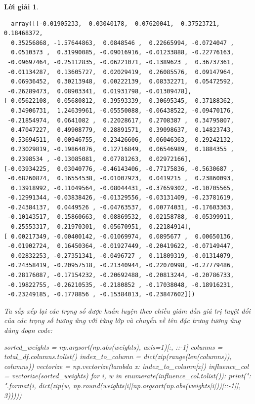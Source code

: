 \documentclass[14pt, a4paper]{article}
\theoremstyle{sltheorem}
\theoremstyle{soltheorem}
\newtheorem*{loigiai}{Lời giải}
\begin{document}
\begin{loigiai}
    \begin{verbatim}
  array([[-0.01905233,  0.03040178,  0.07620041,  0.37523721,  0.18468372,
  0.35256868, -1.57644863,  0.0848546 ,  0.22665994, -0.0724047 ,
  0.0510373 ,  0.31990085, -0.09016916, -0.01233888, -0.22776163,
 -0.09697464, -0.25112835, -0.06221071, -0.1389623 ,  0.36737361,
 -0.01134287,  0.13605727,  0.02029419,  0.26085576,  0.09147964,
  0.06936452,  0.30213948,  0.00222139,  0.08332271,  0.05472592,
 -0.26289473,  0.08903341,  0.01931798, -0.01309478],
[ 0.05622108, -0.05680812,  0.39593339,  0.30695345,  0.37188362,
  0.34906731,  1.24639961, -0.05550088, -0.06438522, -0.09470176,
 -0.21854974,  0.0641082 ,  0.22028617,  0.2708387 ,  0.34795807,
  0.47047227,  0.49908779,  0.28891571,  0.39098637,  0.14823743,
  0.53694511, -0.00946755,  0.23426606, -0.06046363,  0.29242132,
  0.23029819, -0.19864076,  0.12716849,  0.06546989,  0.1884355 ,
  0.2398534 , -0.13085081,  0.07781263,  0.02972166],
[-0.03934225,  0.03040776, -0.46143406, -0.77175836, -0.5630687 ,
 -0.68260874,  0.16554538, -0.01007923,  0.0419215 ,  0.23860093,
  0.13918992, -0.11049564, -0.08044431, -0.37659302, -0.10705565,
 -0.12991344, -0.03838426, -0.01329556, -0.03131409, -0.23781619,
 -0.24384137,  0.0449526 , -0.04763537,  0.00774031, -0.17603363,
 -0.10143517,  0.15860663,  0.08869532,  0.02158788, -0.05399911,
  0.25553317,  0.21970301,  0.05670951,  0.22184914],
[ 0.00217349, -0.00400142, -0.01069974,  0.0895677 ,  0.00650136,
 -0.01902724,  0.16450364, -0.01927449, -0.20419622, -0.07149447,
  0.02832253, -0.27351341, -0.0496727 ,  0.11809319, -0.01314079,
 -0.24358419, -0.20957518, -0.21340944, -0.22070998, -0.27779486,
 -0.28176087, -0.17154232, -0.20692488, -0.20813244, -0.20786733,
 -0.19822755, -0.26210535, -0.2180852 , -0.17038048, -0.18916231,
 -0.23249185, -0.1778856 , -0.15384013, -0.23847602]])
    \end{verbatim}

Ta sắp xếp lại các trọng số được huấn luyện theo chiều giảm dần giá trị tuyệt đối của các trọng số tương ứng với từng lớp và chuyển về tên đặc trưng tương ứng dùng đoạn code:

    \begin{python}
sorted_weights = np.argsort(np.abs(weights), axis=1)[:, ::-1]
columns = total_df.columns.tolist()
index_to_column = dict(zip(range(len(columns)), columns))
vectorize = np.vectorize(lambda x: index_to_column[x])
influence_col = vectorize(sorted_weights)
for i, w in enumerate(influence_col.tolist()):
    print("{}: {}".format(i, dict(zip(w, np.round(weights[i][np.argsort(np.abs(weights[i]))[::-1]], 3)))))
    \end{python}


\end{loigiai}
\end{document}
